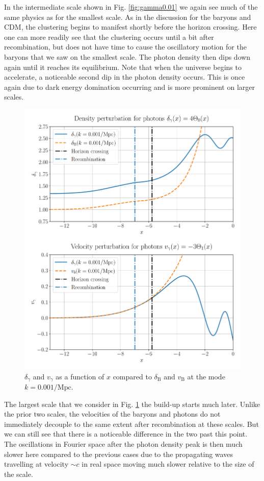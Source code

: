\documentclass[%
reprint,
 amsmath,amssymb,
 aps,
]{revtex4-2}
\begin{document}
In the intermediate scale shown in Fig. \ref{fig:gamma0.01} we again see much of the same physics as for the smallest scale. As in the discussion for the baryons and CDM, the clustering begins to manifest shortly before the horizon crossing. Here one can more readily see that the clustering occurs until a bit after recombination, but does not have time to cause the oscillatory motion for the baryons that we saw on the smallest scale. The photon density then dips down again until it reaches its equilibrium. Note that when the universe begins to accelerate, a noticeable second dip in the photon density occurs. This is once again due to dark energy domination occurring and is more prominent on larger scales.

\begin{figure}[ht!]
	\includegraphics[width = \linewidth]{Figures/gamma0.001.pdf}
	\caption{$\delta_\gamma$ and $v_\gamma$ as a function of $x$ compared to $\delta_\text{B}$ and $v_\text{B}$ at the mode $k=0.001/\text{Mpc}$.}
	\label{fig:gamma0.001}
\end{figure}

The largest scale that we consider in Fig. \ref{fig:gamma0.001} the build-up starts much later. Unlike the prior two scales, the velocities of the baryons and photons do not immediately decouple to the same extent after recombination at these scales. But we can still see that there is a noticeable difference in the two past this point. The oscillations in Fourier space after the photon density peak is then much slower here compared to the previous cases due to the propagating waves travelling at velocity $\sim c$ in real space moving much slower relative to the size of the scale.
\end{document}
